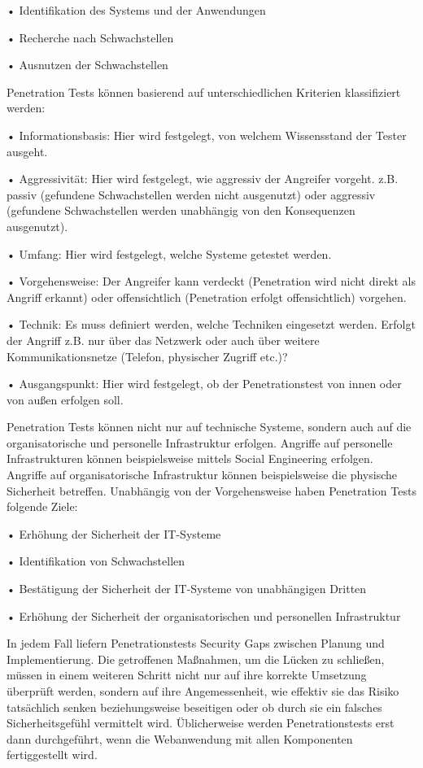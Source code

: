 \documentclass[12pt,oneside,a4paper,parskip]{scrbook}
\begin{document}
    • Identifikation des Systems und der Anwendungen

    • Recherche nach Schwachstellen

    • Ausnutzen der Schwachstellen

    Penetration Tests können basierend auf unterschiedlichen Kriterien klassifiziert werden:

    • Informationsbasis: Hier wird festgelegt, von welchem Wissensstand der Tester ausgeht.

    • Aggressivität: Hier wird festgelegt, wie aggressiv der Angreifer vorgeht. z.B. passiv (gefundene
    Schwachstellen werden nicht ausgenutzt) oder aggressiv (gefundene Schwachstellen werden
    unabhängig von den Konsequenzen ausgenutzt).

    • Umfang: Hier wird festgelegt, welche Systeme getestet werden.

    • Vorgehensweise: Der Angreifer kann verdeckt (Penetration wird nicht direkt als Angriff erkannt)
    oder offensichtlich (Penetration erfolgt offensichtlich) vorgehen.

    • Technik: Es muss definiert werden, welche Techniken eingesetzt werden. Erfolgt der Angriff z.B. nur
    über das Netzwerk oder auch über weitere Kommunikationsnetze (Telefon, physischer Zugriff etc.)?

    • Ausgangspunkt: Hier wird festgelegt, ob der Penetrationstest von innen oder von außen erfolgen
    soll.

    Penetration Tests können nicht nur auf technische Systeme, sondern auch auf die organisatorische und
    personelle Infrastruktur erfolgen. Angriffe auf personelle Infrastrukturen können beispielsweise mittels
    Social Engineering erfolgen. Angriffe auf organisatorische Infrastruktur können beispielsweise die
    physische Sicherheit betreffen.
    Unabhängig von der Vorgehensweise haben Penetration Tests folgende Ziele:

    • Erhöhung der Sicherheit der IT-Systeme

    • Identifikation von Schwachstellen

    • Bestätigung der Sicherheit der IT-Systeme von unabhängigen Dritten

    • Erhöhung der Sicherheit der organisatorischen und personellen Infrastruktur

    In jedem Fall liefern Penetrationstests Security Gaps zwischen Planung und Implementierung. Die
    getroffenen Maßnahmen, um die Lücken zu schließen, müssen in einem weiteren Schritt nicht nur auf ihre
    korrekte Umsetzung überprüft werden, sondern auf ihre Angemessenheit, wie effektiv sie das Risiko
    tatsächlich senken beziehungsweise beseitigen oder ob durch sie ein falsches Sicherheitsgefühl vermittelt
    wird. Üblicherweise werden Penetrationstests erst dann durchgeführt, wenn die Webanwendung mit allen
    Komponenten fertiggestellt wird. \cite{BSI}
\end{document}
